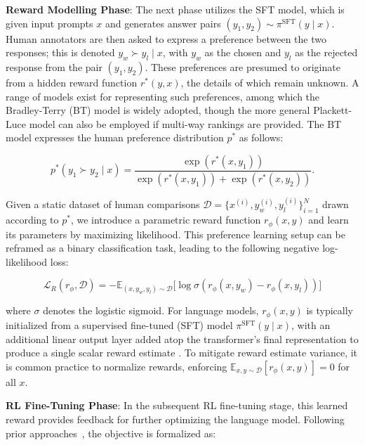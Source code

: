 \textbf{Reward Modelling Phase}: The next phase utilizes the SFT model, which is given input prompts $x$ and generates answer pairs $(y_1, y_2)\sim \pi^\text{SFT}(y \mid x)$. Human annotators are then asked to express a preference between the two responses; this is denoted $y_w\succ y_l \mid x$, with $y_w$ as the chosen and $y_l$ as the rejected response from the pair $(y_1, y_2)$. These preferences are presumed to originate from a hidden reward function $r^*(y, x)$, the details of which remain unknown. A range of models exist for representing such preferences, among which the Bradley-Terry (BT) model \cite{bradley1952rankanalysis} is widely adopted, though the more general Plackett-Luce model \citep{plackett1975analysis, luce2012individual} can also be employed if multi-way rankings are provided. The BT model expresses the human preference distribution $p^*$ as follows:

\begin{equation}\label{eq:bradley-terry}
    p^*(y_1\succ y_2 \mid x)=\frac{\exp\left(r^*(x, y_1)\right)}{\exp\left(r^*(x, y_1)\right) + \exp\left(r^*(x, y_2)\right)}.
\end{equation}

Given a static dataset of human comparisons $\mathcal{D} = \bigl\{x^{(i)}, y_w^{(i)}, y_l^{(i)}\bigr\}_{i=1}^N$ drawn according to $p^*$, we introduce a parametric reward function $r_{\phi}(x, y)$ and learn its parameters by maximizing likelihood. This preference learning setup can be reframed as a binary classification task, leading to the following negative log-likelihood loss:

\begin{equation}\label{eq:reward_model}
    \mathcal{L}_R(r_{\phi}, \mathcal{D}) = -\mathbb{E}_{(x, y_w, y_l)\sim \mathcal{D}}\bigl[\log \sigma(r_{\phi}(x, y_w)- r_{\phi}(x, y_l))\bigr]
\end{equation}

where $\sigma$ denotes the logistic sigmoid. For language models, $r_{\phi}(x, y)$ is typically initialized from a supervised fine-tuned (SFT) model $\pi^\text{SFT}(y \mid x)$, with an additional linear output layer added atop the transformer’s final representation to produce a single scalar reward estimate \cite{ziegler2020finetuning}. To mitigate reward estimate variance, it is common practice to normalize rewards, enforcing $\mathbb{E}_{x,y\sim \mathcal{D}}\left[r_\phi(x, y)\right] = 0$ for all $x$.

\textbf{RL Fine-Tuning Phase}: In the subsequent RL fine-tuning stage, this learned reward provides feedback for further optimizing the language model. Following prior approaches~\citep{jaques2017sequence, jaques2020human}, the objective is formalized as:

